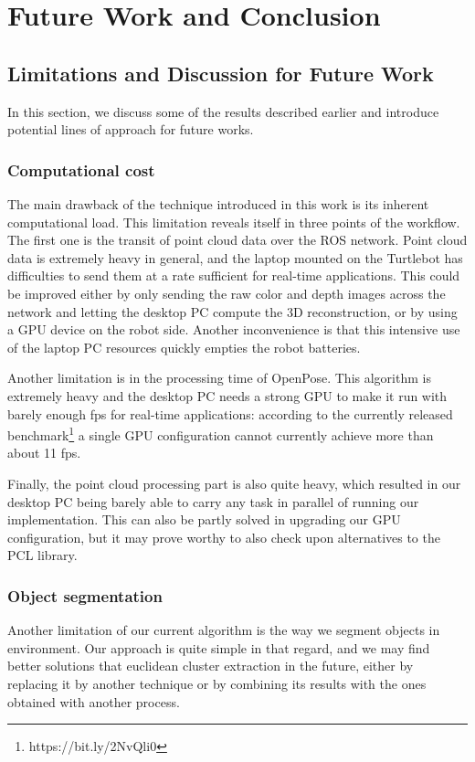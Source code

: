\chapter{Future Work and Conclusion}
\label{chap:conclusion}
\section{Limitations and Discussion for Future Work}
In this section, we discuss some of the results described earlier and introduce potential lines of approach for future works.

\subsection{Computational cost}
The main drawback of the technique introduced in this work is its inherent computational load. This limitation reveals itself in three points of the workflow. The first one is the transit of point cloud data over the ROS network. Point cloud data is extremely heavy in general, and the laptop mounted on the Turtlebot has difficulties to send them at a rate sufficient for real-time applications. This could be improved either by only sending the raw color and depth images across the network and letting the desktop PC compute the 3D reconstruction, or by using a GPU device on the robot side. Another inconvenience is that this intensive use of the laptop PC resources quickly empties the robot batteries. 

Another limitation is in the processing time of OpenPose. This algorithm is extremely heavy and the desktop PC needs a strong GPU to make it run with barely enough fps for real-time applications: according to the currently released benchmark\footnote{https://bit.ly/2NvQli0} a single GPU configuration cannot currently achieve more than about 11 fps.

Finally, the point cloud processing part is also quite heavy, which resulted in our desktop PC being barely able to carry any task in parallel of running our implementation. This can also be partly solved in upgrading our GPU configuration, but it may prove worthy to also check upon alternatives to the PCL library.

\subsection{Object segmentation}
Another limitation of our current algorithm is the way we segment objects in environment. Our approach is quite simple in that regard, and we may find better solutions that euclidean cluster extraction in the future, either by replacing it by another technique or by combining its results with the ones obtained with another process. 

